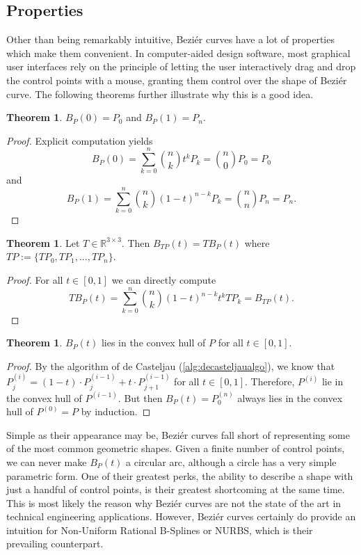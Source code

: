 \documentclass[a4paper, 11pt]{report}
\theoremstyle{definition}
\newtheorem{theorem}[definition]{Theorem}
\begin{document}
\subsection{Properties}
Other than being remarkably intuitive, Beziér curves have a lot of properties which make them convenient. In computer-aided design software, most graphical user interfaces rely on the principle of letting the user interactively drag and drop the control points with a mouse, granting them control over the shape of Beziér curve. The following theorems further illustrate why this is a good idea.

\begin{theorem}
	$B_P(0) = P_0$ and $B_P(1) = P_n$.
\end{theorem}
\begin{proof}
	Explicit computation yields
		$$B_P(0) = \sum_{k=0}^n \binom{n}{k} t^k P_k = \binom{n}{0} P_0 = P_0$$
	and
		$$B_P(1) = \sum_{k=0}^n \binom{n}{k} (1-t)^{n-k} P_k = \binom{n}{n} P_n = P_n.$$
\end{proof}

\begin{theorem}
	Let $T \in \mathbb{R}^{3 \times 3}$. Then $B_{TP}(t) = TB_P(t)$ where $TP := \{TP_0, TP_1, ..., TP_n\}$.
\end{theorem}
\begin{proof}
	For all $t \in [0, 1]$ we can directly compute
		$$TB_P(t) = \sum_{k=0}^n \binom{n}{k} (1-t)^{n-k}t^k TP_k = B_{TP}(t).$$
\end{proof}

\begin{theorem}
	$B_P(t)$ lies in the convex hull of $P$ for all $t \in [0,1]$.
\end{theorem}
\begin{proof}
	By the algorithm of de Casteljau (\ref{alg:decasteljaualgo}), we know that $P^{(i)}_j = (1-t) \cdot P^{(i-1)}_j + t \cdot P^{(i-1)}_{j+1}$ for all $t \in [0, 1]$. Therefore, $P^{(i)}$ lie in the convex hull of $P^{(i-1)}$. But then $B_P(t) = P^{(n)}_0$ always lies in the convex hull of $P^{(0)} = P$ by induction.
\end{proof}

Simple as their appearance may be, Beziér curves fall short of representing some of the most common geometric shapes. Given a finite number of control points, we can never make $B_P(t)$ a circular arc, although a circle has a very simple parametric form. One of their greatest perks, the ability to describe a shape with just a handful of control points, is their greatest shortcoming at the same time. This is most likely the reason why Beziér curves are not the state of the art in technical engineering applications. However, Beziér curves certainly do provide an intuition for Non-Uniform Rational B-Splines or NURBS, which is their prevailing counterpart.
\end{document}
